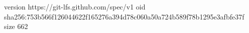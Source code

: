 version https://git-lfs.github.com/spec/v1
oid sha256:753b566f126044622f165276a394d78c060a50a724b589f78b1295e3afbfe37f
size 662
